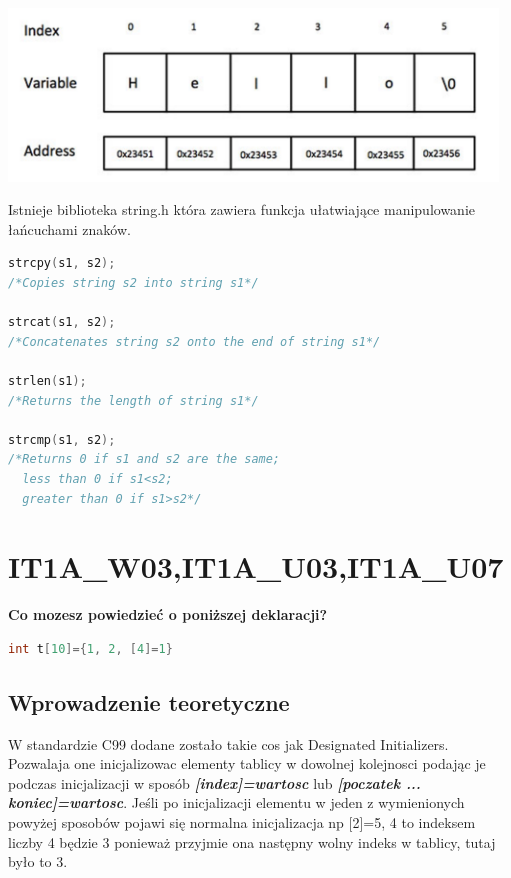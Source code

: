 \begin{center}
\includegraphics[width=13cm]{string_in_c}
\end{center}

Istnieje biblioteka string.h która zawiera funkcja ułatwiające manipulowanie łańcuchami znaków.
\begin{lstlisting}[language=c]
strcpy(s1, s2); 
/*Copies string s2 into string s1*/

strcat(s1, s2);
/*Concatenates string s2 onto the end of string s1*/

strlen(s1);
/*Returns the length of string s1*/

strcmp(s1, s2);
/*Returns 0 if s1 and s2 are the same;
  less than 0 if s1<s2;
  greater than 0 if s1>s2*/
\end{lstlisting}


\section{IT1A\_W03,IT1A\_U03,IT1A\_U07}
\textbf{Co mozesz powiedzieć o poniższej deklaracji?}
\begin{lstlisting}[language=c]
int t[10]={1, 2, [4]=1}
\end{lstlisting}

\subsection{Wprowadzenie teoretyczne}
W standardzie C99 dodane zostało takie cos jak Designated Initializers. Pozwalaja one inicjalizowac elementy tablicy w dowolnej kolejnosci podając je podczas inicjalizacji w sposób \textbf{\textit{[index]=wartosc}} lub \textbf{\textit{[poczatek ... koniec]=wartosc}}. Jeśli po inicjalizacji elementu w jeden z wymienionych powyżej sposobów pojawi się normalna inicjalizacja np {[2]=5, 4} to indeksem liczby 4 będzie 3 ponieważ przyjmie ona następny wolny indeks w tablicy, tutaj było to 3.

